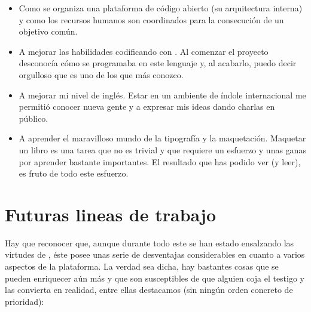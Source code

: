 \begin{itemize}

\item Como se organiza una plataforma de código abierto (su arquitectura interna) y como los recursos humanos son coordinados para la consecución de un objetivo común.

\item A mejorar las habilidades codificando con \php{}. Al comenzar el proyecto desconocía cómo se programaba en este lenguaje y, al acabarlo, puedo decir orgulloso que es uno de los que más conozco.

\item A mejorar mi nivel de inglés. Estar en un ambiente de índole internacional me permitió conocer nueva gente y a expresar mis ideas dando charlas en público.

\item A aprender el maravilloso mundo de la tipografía y la maquetación. Maquetar un libro es una tarea que no es trivial y que requiere un esfuerzo y unas ganas por aprender bastante importantes. El resultado que has podido ver (y leer), es fruto de todo este esfuerzo.

\end{itemize}

\section{Futuras lineas de trabajo}

Hay que reconocer que, aunque durante todo este \pfc{} se han estado ensalzando las virtudes de \tiki{}, éste posee unas serie de desventajas considerables en cuanto a varios aspectos de la plataforma. La verdad sea dicha, hay bastantes cosas que se pueden enriquecer aún más y que son susceptibles de que alguien coja el testigo y las convierta en realidad, entre ellas destacamos (sin ningún orden concreto de prioridad):

